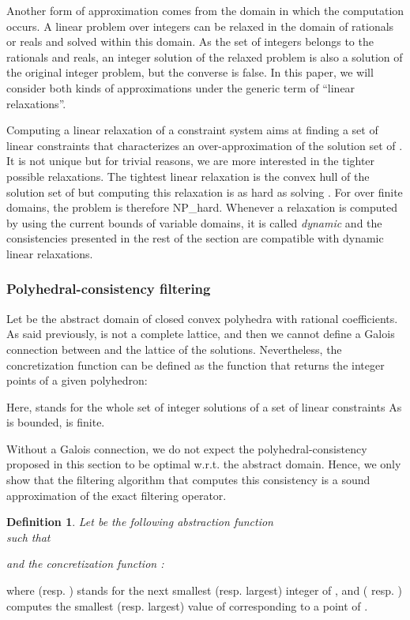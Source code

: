 \documentclass[submission,copyright,creativecommons]{eptcs}
\newtheorem{definition}{Definition}
\begin{document}
Another form of approximation comes from the domain in which the computation occurs.
A linear problem over integers can be relaxed in the domain of rationals or reals 
and solved within this domain. As the set of integers belongs to the rationals and reals,
an integer solution of the relaxed problem is also a solution of the original integer problem,
but the converse is false. In this paper, we will consider both kinds of approximations 
under the generic term of ``linear relaxations''.

Computing a linear relaxation of a constraint system  aims at finding a set of
linear constraints that characterizes an over-approximation of the solution set of
. It is not unique but for trivial reasons, we are more interested in the tighter 
possible relaxations. The tightest linear relaxation is the convex hull of the solution set
of  but computing this relaxation is as hard as solving . For  over finite domains,
the problem is therefore NP\_hard. 
Whenever a relaxation is computed by using the current bounds 
of variable domains, it is called {\it dynamic} and the consistencies presented in the rest
of the section are compatible with dynamic linear relaxations.

\subsubsection{Polyhedral-consistency filtering}

Let  be the abstract domain of closed convex polyhedra with rational coefficients.
As said previously,  is not a complete lattice, and then we cannot define
a Galois connection between  and the lattice of the solutions.
Nevertheless, the concretization function  
 can be defined as the function that
returns the integer points of a given polyhedron:

Here,   stands for the whole set of integer solutions of a set of linear constraints
As  is bounded,  is finite.

Without a Galois connection, we do not expect the polyhedral-consistency
proposed in this section to be optimal w.r.t. the abstract domain.
Hence, we only show that the filtering algorithm that computes this
consistency is a sound approximation of the exact filtering operator.

\begin{definition}
Let  be the following abstraction function\\

such that

and the concretization function :

\end{definition}
\noindent
where  (resp. ) stands for the next smallest (resp. largest) integer of ,
and  ( resp. ) computes the smallest (resp. largest) value of  corresponding to a point of .
\end{document}
